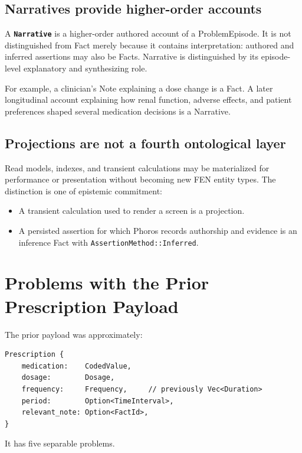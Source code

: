 \documentclass[11pt]{article}
\newcommand{\entity}[1]{\texttt{\textbf{#1}}}
\newcommand{\field}[1]{\texttt{#1}}
\begin{document}
\subsection{Narratives provide higher-order accounts}

A \entity{Narrative} is a higher-order authored account of a ProblemEpisode.
It is not distinguished from Fact merely because it contains interpretation:
authored and inferred assertions may also be Facts. Narrative is distinguished
by its episode-level explanatory and synthesizing role.

For example, a clinician's Note explaining a dose change is a Fact. A later
longitudinal account explaining how renal function, adverse effects, and
patient preferences shaped several medication decisions is a Narrative.

\subsection{Projections are not a fourth ontological layer}

Read models, indexes, and transient calculations may be materialized for
performance or presentation without becoming new FEN entity types. The
distinction is one of epistemic commitment:

\begin{itemize}[noitemsep]
  \item A transient calculation used to render a screen is a projection.
  \item A persisted assertion for which Phoros records authorship and
    evidence is an inference Fact with \field{AssertionMethod::Inferred}.
\end{itemize}

\section{Problems with the Prior Prescription Payload}
\label{sec:current-problems}

The prior payload was approximately:

\begin{lstlisting}
Prescription {
    medication:    CodedValue,
    dosage:        Dosage,
    frequency:     Frequency,     // previously Vec<Duration>
    period:        Option<TimeInterval>,
    relevant_note: Option<FactId>,
}
\end{lstlisting}

It has five separable problems.
\end{document}
